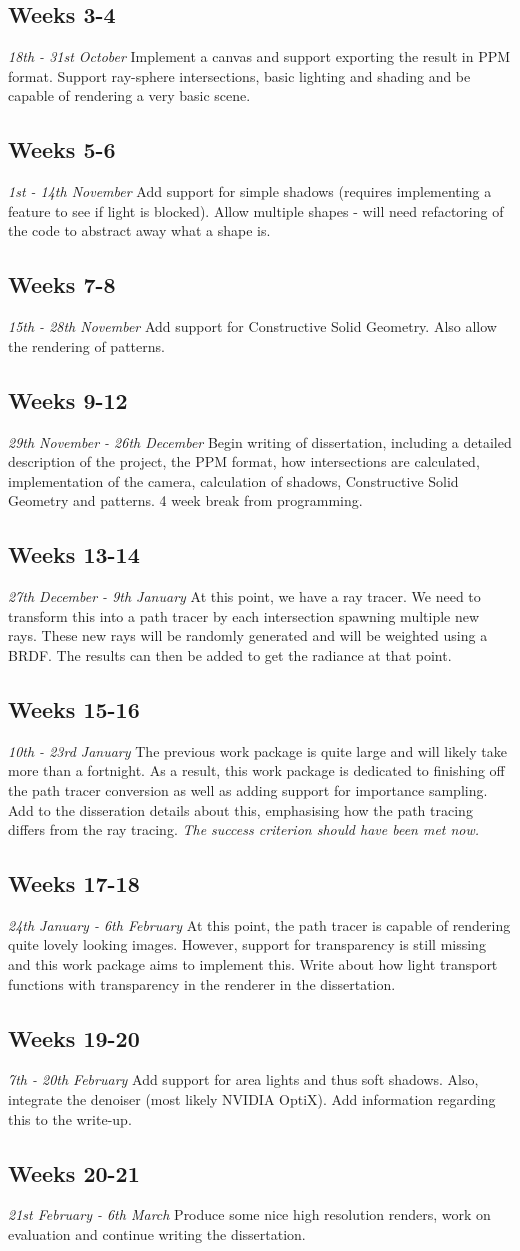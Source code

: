 \documentclass[12pt, a4paper]{article}
\newcommand{\newtime}[3]{
    \subsection*{#1}
    \vspace{-\baselineskip}
    \emph{#2}
    \vspace{\baselineskip}
    \newline
    #3
}
\begin{document}
    \newtime{Weeks 3-4}{18th - 31st October}{Implement a canvas and support exporting the result in PPM format. Support ray-sphere intersections, basic lighting and shading and be capable of rendering a very basic scene.}

    \newtime{Weeks 5-6}{1st - 14th November}{Add support for simple shadows (requires implementing a feature to see if light is blocked). Allow multiple shapes - will need refactoring of the code to abstract away what a shape is.}

    \newtime{Weeks 7-8}{15th - 28th November}{Add support for Constructive Solid Geometry. Also allow the rendering of patterns.}

    \newtime{Weeks 9-12}{29th November - 26th December}{Begin writing of dissertation, including a detailed description of the project, the PPM format, how intersections are calculated, implementation of the camera, calculation of shadows, Constructive Solid Geometry and patterns. 4 week break from programming.}

    \newtime{Weeks 13-14}{27th December - 9th January}{At this point, we have a ray tracer. We need to transform this into a path tracer by each intersection spawning multiple new rays. These new rays will be randomly generated and will be weighted using a BRDF. The results can then be added to get the radiance at that point.}

    \newtime{Weeks 15-16}{10th - 23rd January}{The previous work package is quite large and will likely take more than a fortnight. As a result, this work package is dedicated to finishing off the path tracer conversion as well as adding support for importance sampling. Add to the disseration details about this, emphasising how the path tracing differs from the ray tracing. \emph{The success criterion should have been met now.}}

    \newtime{Weeks 17-18}{24th January - 6th February}{At this point, the path tracer is capable of rendering quite lovely looking images. However, support for transparency is still missing and this work package aims to implement this. Write about how light transport functions with transparency in the renderer in the dissertation.}

    \newtime{Weeks 19-20}{7th - 20th February}{Add support for area lights and thus soft shadows. Also, integrate the denoiser (most likely NVIDIA OptiX). Add information regarding this to the write-up.}

    \newtime{Weeks 20-21}{21st February - 6th March}{Produce some nice high resolution renders, work on evaluation and continue writing the dissertation.}
\end{document}
